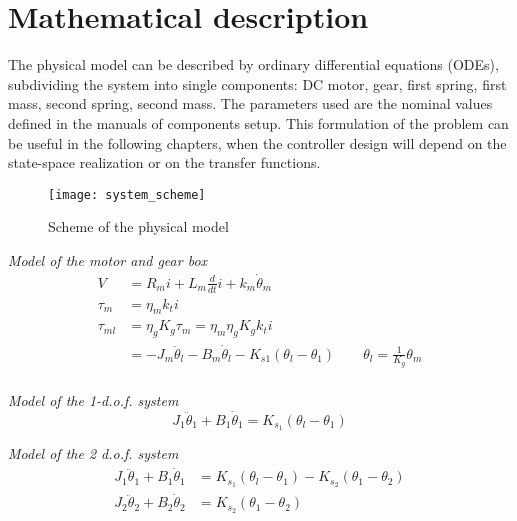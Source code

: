 \section{Mathematical description}

The physical model can be described by ordinary differential equations (ODEs), subdividing the system into single components: DC motor, gear, first spring, first mass, second spring, second mass. The parameters used are the nominal values defined in the manuals of components setup. This formulation of the problem can be useful in the following chapters, when the controller design will depend on the state-space realization or on the transfer functions.
\begin{figure*}[h]
	\centering
	\texttt{[image: system\_scheme]}
	\caption{Scheme of the physical model}
\end{figure*}

\textit{Model of the motor and gear box}
\begin{subequations}
	\begin{align}
		V &= R_m i + L_m \frac{d}{dt}i + k_m \dot{\theta}_m \\
		\tau_m &= \eta_m k_t i \\
		\tau_{ml} &= \eta_g K_g \tau_m = \eta_m \eta_g K_g k_t i\\
		&= -J_m \ddot{\theta}_l - B_m \dot{\theta}_l - K_{s1} ( \theta_l - \theta_1 ) \qquad  \theta_l = \frac {1}{K_g} \theta_m \\
		\label{fig:model_equations}
	\end{align}
\end{subequations}

\textit{Model of the 1-d.o.f. system}
\begin{equation}
	J_1 \ddot{\theta}_1 + B_1 \dot{\theta}_1 = K_{s_1} ( \theta_l - \theta_1 )
\end{equation}

\textit{Model of the 2 d.o.f. system}
\begin{subequations}
	\begin{align}
		J_1 \ddot{\theta}_1 + B_1 \dot{\theta}_1 &= K_{s_1} ( \theta_l - \theta_1 ) - K_{s_2} ( \theta_1 - \theta_2 ) \\
		J_2 \ddot{\theta}_2 + B_2 \dot{\theta}_2 &= K_{s_2} ( \theta_1 - \theta_2 )
	\end{align}
\end{subequations}

